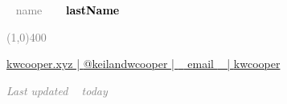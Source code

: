 \documentclass[9pt]{result/developercv} %
\begin{document}

	
	

\begin{center}
\HUGE\textcolor{gray}{~{{ name }}~}
\HUGE\textcolor{black}{\textbf{~{{ lastName }}~}}
\end{center}

\begin{center}
\textcolor{gray}{\line(1,0){400}}
\end{center}

\begin{center}
\href{https://kwcooper.xyz}{\faGlobe \hspace{0.05cm} kwcooper.xyz | \hspace{0.1cm}}
\href{https://twitter.com/kwcooper}{\faTwitter \hspace{0.05cm} @keilandwcooper | \hspace{0.1cm}} 
\href{mailto: ~{{ email }}~ }{\faAt \hspace{0.05cm} ~{{ email }}~ | \hspace{0.1cm}} 
\href{https://github.com/kwcooper}{\faGithub \hspace{0.05cm} kwcooper} 
\end{center}

\begin{center} \emph{\textcolor{gray}{Last updated ~{{ today }}~}} \end{center}
\vspace{0.7cm}
\end{document}
